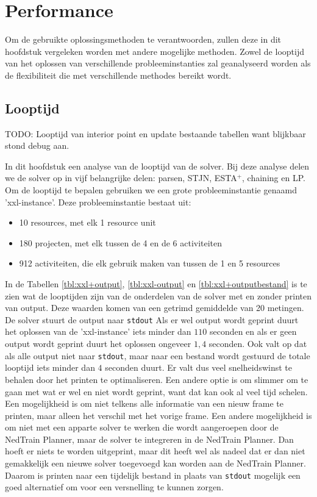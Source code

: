 \section{Performance}
Om de gebruikte oplossingsmethoden te verantwoorden, zullen deze in dit hoofdstuk vergeleken worden met andere mogelijke methoden. Zowel de looptijd van het oplossen van verschillende probleeminstanties zal geanalyseerd worden als de flexibiliteit die met verschillende methodes bereikt wordt.

\subsection{Looptijd}
TODO: Looptijd van interior point en update bestaande tabellen want blijkbaar stond debug aan.

In dit hoofdstuk een analyse van de looptijd van de solver. Bij deze analyse delen we de solver op in vijf belangrijke delen: parsen, STJN, ESTA$^+$, chaining en LP. Om de looptijd te bepalen gebruiken we een grote probleeminstantie genaamd 'xxl-instance'. Deze probleeminstantie bestaat uit:
\begin{itemize}
    \item 10 resources, met elk 1 resource unit
    \item 180 projecten, met elk tussen de 4 en de 6 activiteiten
    \item 912 activiteiten, die elk gebruik maken van tussen de 1 en 5 resources
\end{itemize}

In de Tabellen \ref{tbl:xxl+output}, \ref{tbl:xxl-output} en \ref{tbl:xxl+outputbestand} is te zien wat de looptijden zijn van de onderdelen van de solver met en zonder printen van output. Deze waarden komen van een getrimd gemiddelde van 20 metingen. De solver stuurt de output naar \texttt{stdout} Als er wel output wordt geprint duurt het oplossen van de 'xxl-instance' iets minder dan $110$ seconden en als er geen output wordt geprint duurt het oplossen ongeveer $1,4$ seconden. Ook valt op dat als alle output niet naar \texttt{stdout}, maar naar een bestand wordt gestuurd de totale looptijd iets minder dan $4$ seconden duurt. Er valt dus veel snelheidswinst te behalen door het printen te optimaliseren. Een andere optie is om slimmer om te gaan met wat er wel en niet wordt geprint, want dat kan ook al veel tijd schelen. Een mogelijkheid is om niet telkens alle informatie van een nieuw frame te printen, maar alleen het verschil met het vorige frame. Een andere mogelijkheid is om niet met een apparte solver te werken die wordt aangeroepen door de NedTrain Planner, maar de solver te integreren in de NedTrain Planner. Dan hoeft er niets te worden uitgeprint, maar dit heeft wel als nadeel dat er dan niet gemakkelijk een nieuwe solver toegevoegd kan worden aan de NedTrain Planner. Daarom is printen naar een tijdelijk bestand in plaats van \texttt{stdout} mogelijk een goed alternatief om voor een versnelling te kunnen zorgen. 


